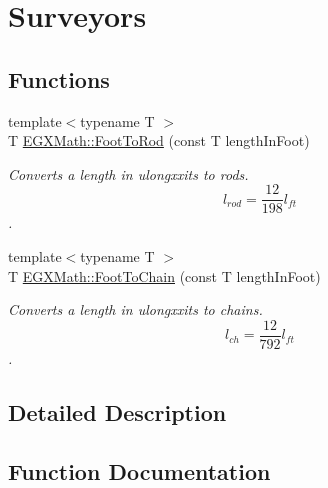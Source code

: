 \hypertarget{group___e_g_x_math-_conversions-_length_conversions-_imperial-_foot-_surveyors}{}\section{Surveyors}
\label{group___e_g_x_math-_conversions-_length_conversions-_imperial-_foot-_surveyors}
\subsection*{Functions}
\begin{DoxyCompactItemize}
\item 
{\footnotesize template$<$typename T $>$ }\\T \mbox{\hyperlink{group___e_g_x_math-_conversions-_length_conversions-_imperial-_foot-_surveyors_gace4054ff26544ac7fa6717cec4ce9491}{E\+G\+X\+Math\+::\+Foot\+To\+Rod}} (const T length\+In\+Foot)
\begin{DoxyCompactList}\small\item\em Converts a length in ulongxxits to rods. \[ l_{rod}= \frac{12}{198} l_{ft} \]. \end{DoxyCompactList}\item 
{\footnotesize template$<$typename T $>$ }\\T \mbox{\hyperlink{group___e_g_x_math-_conversions-_length_conversions-_imperial-_foot-_surveyors_ga518f4539e56a49bfc866ec22139752e1}{E\+G\+X\+Math\+::\+Foot\+To\+Chain}} (const T length\+In\+Foot)
\begin{DoxyCompactList}\small\item\em Converts a length in ulongxxits to chains. \[ l_{ch}= \frac{12}{792} l_{ft} \]. \end{DoxyCompactList}\end{DoxyCompactItemize}


\subsection{Detailed Description}


\subsection{Function Documentation}
\mbox{\label{group___e_g_x_math-_conversions-_length_conversions-_imperial-_foot-_surveyors_ga518f4539e56a49bfc866ec22139752e1}} 
